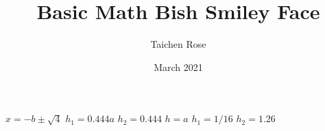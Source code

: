 \documentclass{article}
\title{Basic Math Bish Smiley Face}
\author{Taichen Rose}
\date{March 2021}
\begin{document}
$x = -b \pm \sqrt{4}$
$h_{1}= 0.444a$
$h_{2}= 0.444$
$h = a$
$h_{1} = 1/16$
$h_{2} = 1.26$
\end{document}
